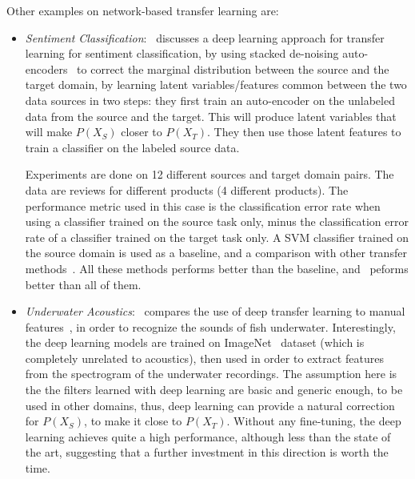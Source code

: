   \par Other examples on network-based transfer learning are:
  \begin{itemize}
    \item \textit{Sentiment Classification}:~\citep{glorot2011domain} discusses a deep learning approach for transfer learning for sentiment classification, by using stacked de-noising auto-encoders~\citep{vincent2008extracting} to correct the marginal distribution between the source and the target domain, by learning latent variables/features common between the two data sources in two steps: they first train an auto-encoder on the unlabeled data from the source and the target. This will produce latent variables that will make $P(X_S)$ closer to $P(X_T)$. They then use those latent features to train a classifier on the labeled source data.

    Experiments are done on 12 different sources and target domain pairs. The data are reviews for different products (4 different products). The performance metric used in this case is the classification error rate when using a classifier trained on the source task only, minus the classification error rate of a classifier trained on the target task only. A SVM classifier trained on the source domain is used as a baseline, and a comparison with other transfer methods~\citep{blitzer2006domain,li2008multi,pan2010cross}. All these methods performs better than the baseline, and~\citep{glorot2011domain} peforms better than all of them.

    \item \textit{Underwater Acoustics}:~\citep{malfante2018use} compares the use of deep transfer learning to manual features~\citep{malfante2016automatic,malfante2018machine}, in order to recognize the sounds of fish underwater. Interestingly, the deep learning models are trained on ImageNet~\citep{imagenet_cvpr09} dataset (which is completely unrelated to acoustics), then used in order to extract features from the spectrogram of the underwater recordings. The assumption here is the the filters learned with deep learning are basic and generic enough, to be used in other domains, thus, deep learning can provide a natural correction for $P(X_S)$, to make it close to $P(X_T)$. Without any fine-tuning, the deep learning achieves quite a high performance, although less than the state of the art, suggesting that a further investment in this direction is worth the time.


\end{itemize}

